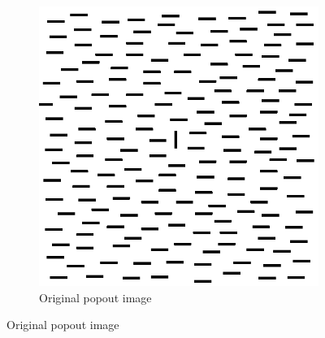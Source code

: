\begin{figure}[H]
  \centering
	\begin{subfigure}{.7\textwidth}
    \centering
    \includegraphics[width=.9\textwidth]{./canny/popout}
    \caption{Original popout image}
    \label{fig:popout}
  \end{subfigure}%

\end{figure}